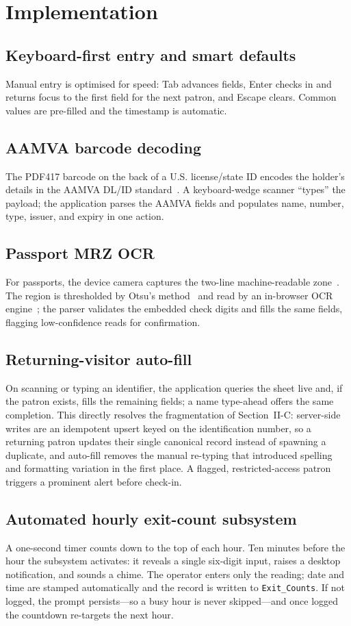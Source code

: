 \documentclass[conference]{IEEEtran}
\begin{document}
\section{Implementation}
\subsection{Keyboard-first entry and smart defaults}
Manual entry is optimised for speed: Tab advances fields, Enter checks in and returns focus to the first field for the next patron, and Escape clears. Common values are pre-filled and the timestamp is automatic.

\subsection{AAMVA barcode decoding}
The PDF417 barcode on the back of a U.S. license/state ID encodes the holder's details in the AAMVA DL/ID standard~\cite{aamva}. A keyboard-wedge scanner ``types'' the payload; the application parses the AAMVA fields and populates name, number, type, issuer, and expiry in one action.

\subsection{Passport MRZ OCR}
For passports, the device camera captures the two-line machine-readable zone~\cite{icao9303}. The region is thresholded by Otsu's method~\cite{otsu} and read by an in-browser OCR engine~\cite{tesseract}; the parser validates the embedded check digits and fills the same fields, flagging low-confidence reads for confirmation.

\subsection{Returning-visitor auto-fill}
On scanning or typing an identifier, the application queries the sheet live and, if the patron exists, fills the remaining fields; a name type-ahead offers the same completion. This directly resolves the fragmentation of Section~II-C: server-side writes are an idempotent upsert keyed on the identification number, so a returning patron updates their single canonical record instead of spawning a duplicate, and auto-fill removes the manual re-typing that introduced spelling and formatting variation in the first place. A flagged, restricted-access patron triggers a prominent alert before check-in.

\subsection{Automated hourly exit-count subsystem}
A one-second timer counts down to the top of each hour. Ten minutes before the hour the subsystem activates: it reveals a single six-digit input, raises a desktop notification, and sounds a chime. The operator enters only the reading; date and time are stamped automatically and the record is written to \texttt{Exit\_Counts}. If not logged, the prompt persists---so a busy hour is never skipped---and once logged the countdown re-targets the next hour.
\end{document}
